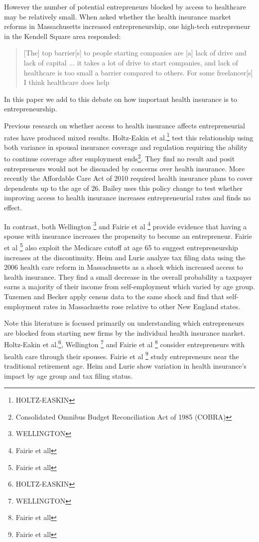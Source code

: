\documentclass[12pt]{article}
\begin{document}
However the number of potential entrepreneurs blocked by access to healthcare may be relatively small. When asked whether the health insurance market reforms in Massachusetts increased entrepreneurship, one high-tech entrepreneur in the Kendell Square area responded:
\begin{quote}
[The] top barrier[s] to people starting companies are [a] lack of drive and lack of capital ... it takes a lot of drive to start companies, and lack of healthcare is too small a barrier compared to others. For some freelancer[s] I think healthcare does help
\end{quote}
In this paper we add to this debate on how important health insurance is to entrepreneurship. 

Previous research on whether access to health insurance affects entrepreneurial rates have produced mixed results. Holtz-Eakin et al.\footnote{HOLTZ-EASKIN} test this relationship using both variance in spousal insurance coverage and regulation requiring the ability to continue coverage after employment ends\footnote{Consolidated Omnibus Budget Reconciliation Act of 1985 (COBRA)}. They find no result and posit entrepreneurs would not be dissuaded by concerns over health insurance. More recently the Affordable Care Act of 2010 required health insurance plans to cover dependents up to the age of 26. Bailey uses this policy change to test whether improving access to health insurance increases entrepreneurial rates and finds no effect. 

In contrast, both Wellington \footnote{WELLINGTON} and Fairie et al \footnote{Fairie et all} provide evidence that having a spouse with insurance increases the propensity to become an entrepreneur. Fairie et al \footnote{Fairie et all} also exploit the Medicare cutoff at age 65 to suggest entrepreneurship increases at the discontinuity. Heim and Lurie analyze tax filing data using the 2006 health care reform in Massachusetts as a shock which increased access to health insurance. They find a small decrease in the overall probability a taxpayer earns a majority of their income from self-employment which varied by age group. Tuzemen and Becker apply census data to the same shock and find that self-employment rates in Massachuetts rose relative to other New England states. 

Note this literature is focused primarily on understanding which entrepreneurs are blocked from starting new firms by the individual health insurance market. Holtz-Eakin et al.\footnote{HOLTZ-EASKIN}, Wellington \footnote{WELLINGTON} and Fairie et al \footnote{Fairie et all} consider entrepreneurs with health care through their spouses. Fairie et al \footnote{Fairie et all} study entrepreneurs near the traditional retirement age. Heim and Lurie show variation in health insurance's impact by age group and tax filing status. 
\end{document}
